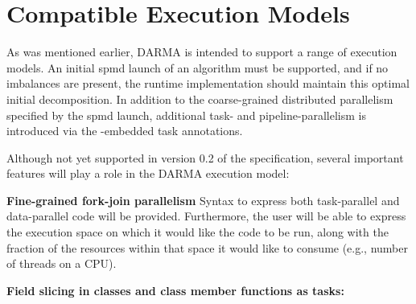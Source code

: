 
\section{Compatible Execution Models}
\label{sec:exec_model}

As was mentioned earlier, DARMA is intended to support a range of execution
models.  An initial \gls{spmd} launch of an algorithm must be supported, and if
no imbalances are present, the runtime implementation should maintain this
optimal initial decomposition. In addition to the coarse-grained distributed
parallelism specified by the \gls{spmd} launch, additional task- and
pipeline-parallelism is introduced via the \CC-embedded task annotations.

Although not yet supported in version 0.2 of the specification, several
important features will play a role in the DARMA execution model:
\begin{compactdesc}
\item{\bf Fine-grained \gls{fork-join} parallelism}
Syntax to express both task-parallel and data-parallel code will be provided.
Furthermore, the user will be able to express the \gls{execution space} on
which it would like the code to be run, along with the fraction of the resources within
that space it would like to consume (e.g., number of threads on a CPU).
\item{\bf Field slicing in classes and class member functions as tasks:}
\end{compactdesc}

